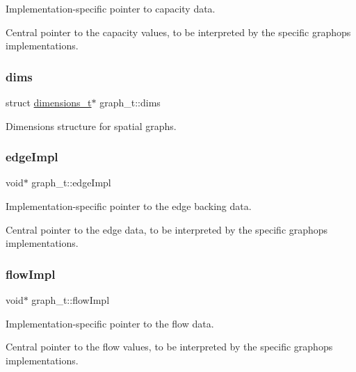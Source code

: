 Implementation-\/specific pointer to capacity data. 

Central pointer to the capacity values, to be interpreted by the specific graphops implementations. \mbox{\label{structgraph__t_ad93f0c58ec1bb357b8d33def7259a1a3}} 
\subsubsection{\texorpdfstring{dims}{dims}}
{\footnotesize\ttfamily struct \hyperlink{structdimensions__t}{dimensions\+\_\+t}$\ast$ graph\+\_\+t\+::dims}



Dimensions structure for spatial graphs. 

\mbox{\label{structgraph__t_acadea26a56e788cb109413045138faba}} 
\subsubsection{\texorpdfstring{edge\+Impl}{edgeImpl}}
{\footnotesize\ttfamily void$\ast$ graph\+\_\+t\+::edge\+Impl}



Implementation-\/specific pointer to the edge backing data. 

Central pointer to the edge data, to be interpreted by the specific graphops implementations. \mbox{\label{structgraph__t_aff85993441e72a7815da3fa1b048e5eb}} 
\subsubsection{\texorpdfstring{flow\+Impl}{flowImpl}}
{\footnotesize\ttfamily void$\ast$ graph\+\_\+t\+::flow\+Impl}



Implementation-\/specific pointer to the flow data. 

Central pointer to the flow values, to be interpreted by the specific graphops implementations. \mbox{\label{structgraph__t_a220aff118ba6d13c927486099988c03d}} 
